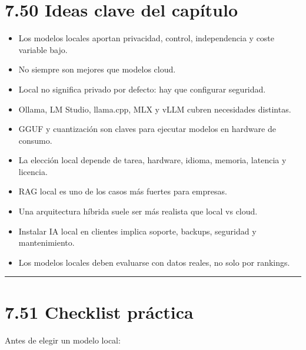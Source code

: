 \section{7.50 Ideas clave del
capítulo}\label{ideas-clave-del-capuxedtulo-6}

\begin{itemize}
\tightlist
\item
  Los modelos locales aportan privacidad, control, independencia y coste
  variable bajo.
\item
  No siempre son mejores que modelos cloud.
\item
  Local no significa privado por defecto: hay que configurar seguridad.
\item
  Ollama, LM Studio, llama.cpp, MLX y vLLM cubren necesidades distintas.
\item
  GGUF y cuantización son claves para ejecutar modelos en hardware de
  consumo.
\item
  La elección local depende de tarea, hardware, idioma, memoria,
  latencia y licencia.
\item
  RAG local es uno de los casos más fuertes para empresas.
\item
  Una arquitectura híbrida suele ser más realista que local vs cloud.
\item
  Instalar IA local en clientes implica soporte, backups, seguridad y
  mantenimiento.
\item
  Los modelos locales deben evaluarse con datos reales, no solo por
  rankings.
\end{itemize}

\begin{center}\rule{0.5\linewidth}{0.5pt}\end{center}

\section{7.51 Checklist práctica}\label{checklist-pruxe1ctica-6}

Antes de elegir un modelo local:

